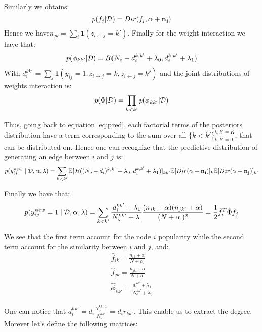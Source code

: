 \documentclass[a4paper, 12pt]{article}
\begin{document}
Similarly we obtains:
\begin{equation}
p(f_j|\mathcal{D}) = Dir(f_j, \mathbf{\alpha} + \mathbf{n_j})
\end{equation}
Hence we have$n_{jk} = \sum_i \bm{1}( z_{i\leftarrow j}=k')$.
Finally for the weight interaction we have that:
\begin{equation}
p(\phi_{kk'}|\mathcal{D}) = B(N_o- d_i^{k,k'} +\lambda_0, d_i^{k,k'} + \lambda_1)
\end{equation}
With $d_i^{kk'} = \sum_j \bm{1}(y_{ij}=1, z_{i\rightarrow j}=k, z_{i\leftarrow j}=k' )$ and the joint distributions of weights interaction is:
\begin{equation}
p(\Phi |\mathcal{D}) = \prod_{k<k'} p(\phi_{kk'}|\mathcal{D})
\end{equation}

Thus, going back to equation \eqref{eq:pred}, each factorial terms of the posteriors distribution have a term  corresponding to the sum over all $\{k<k'\}_{k, k'=0}^{k,k'=K}$, that can be distributed on. Hence one can recognize that the predictive distribution of generating an edge between $i$ and $j$ is:
\begin{equation}
p(y_{ij}^{new} \mid \mathcal{D}, \alpha, \lambda) = \sum_{k<k'} \mathbb{E}[B((N_o- d_i)^{k,k'} +\lambda_0, d_i^{k,k'} + \lambda_1)]_{kk'} \mathbb{E}[Dir(\mathbf{\alpha} + \mathbf{n_i})]_k \mathbb{E}[ Dir(\mathbf{\alpha} + \mathbf{n_j})]_{k'}
\end{equation}

Finally we have that:
\begin{equation}
p(y_{ij}^{new}=1 \mid \mathcal{D}, \alpha, \lambda)= \sum_{k<k'} \frac{ d_i^{kk'} + \lambda_1}{N_o^{kk'} + \lambda_{.}} \frac{(n_{ik}+ \alpha)(n_{jk'} + \alpha)}{(N+\alpha_.)^2} =\frac{1}{2} \hat f_i^T \hat \Phi \hat f_j
\end{equation}

We see that the first term account for the node $i$ popularity while the second term account for the similarity between $i$ and $j$, and:
\begin{align}
\hat f_{ik} = \frac{n_{ik}+ \alpha}{N+\alpha_.} \\
\hat f_{jk} = \frac{n_{jk}+ \alpha}{N+\alpha_.} \\
\hat \phi_{kk'} = \frac{ d_i^{kk'} + \lambda_1}{N_o^{kk'} + \lambda_{.}}
\end{align}

One can notice that $d_i^{kk'} = d_i \frac{N_o^{kk',1}}{N_o^{kk'}}=d_i r_{kk'}$. This enable us to extract the degree. Morever let's define the following matrices:
\end{document}

